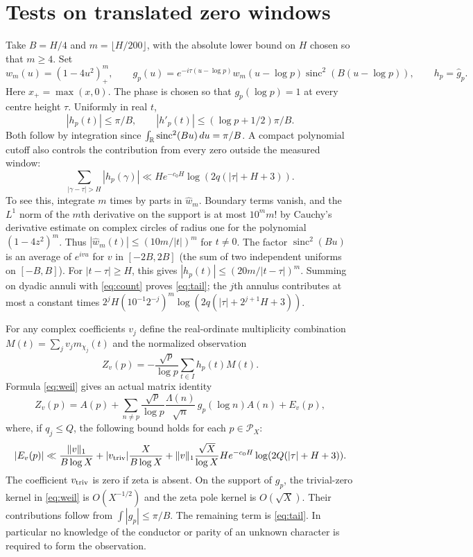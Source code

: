 \documentclass[11pt]{article}
\newcommand{\dd}{\,d}\DeclareMathOperator{\sinc}{sinc}
\newcommand{\calP}{\mathcal P}\newcommand{\wh}{\widehat}
\begin{document}
\section{Tests on translated zero windows}
Take $B=H/4$ and $m=\lfloor H/200\rfloor$, with the absolute lower
bound on $H$ chosen so that $m\ge4$. Set
\[
 w_m(u)=(1-4u^2)_+^m,\qquad
 g_p(u)= e^{-i\tau(u-\log p)}w_m(u-\log p)\sinc^2(B(u-\log p)),
 \qquad h_p=\wh g_p .
\]
Here $x_+=\max(x,0)$. The phase is chosen so that $g_p(\log p)=1$ at
every centre height $\tau$. Uniformly in real $t$,
\begin{equation}\label{eq:lip}
 |h_p(t)|\le \pi/B,\qquad |h'_p(t)|\le (\log p+1/2)\pi/B .
\end{equation}
Both follow by integration since $\int_\R\sinc^2(Bu)\dd u=\pi/B$.
A compact polynomial cutoff also controls the contribution from every
zero outside the measured window:
\begin{equation}\label{eq:tail}
 \sum_{|\gamma-\tau|>H}|h_p(\gamma)|
 \ll H e^{-c_0H}\log(2q(|\tau|+H+3)).
\end{equation}
To see this, integrate $m$ times by parts in $\wh w_m$. Boundary terms
vanish, and the $L^1$ norm of the $m$th derivative on the support is at most
$10^m m!$ by Cauchy's derivative estimate on complex circles of radius one
for the polynomial $(1-4z^2)^m$. Thus
$|\wh w_m(t)|\le(10m/|t|)^m$ for $t\ne0$.
The factor $\sinc^2(Bu)$ is an average of $e^{ivu}$ for $v$ in $[-2B,2B]$
(the sum of two independent uniforms on $[-B,B]$).
For $|t-\tau|\ge H$, this gives
$|h_p(t)|\le(20m/|t-\tau|)^m$.
Summing on dyadic annuli with \eqref{eq:count} proves \eqref{eq:tail};
the $j$th annulus contributes at most a constant times
$2^jH(10^{-1}2^{-j})^m\log(2q(|\tau|+2^{j+1}H+3))$.

For any complex coefficients $v_j$ define the real-ordinate multiplicity
combination $M(t)=\sum_jv_jm_{\chi_j}(t)$ and the normalized observation
\[
 Z_v(p)=-\frac{\sqrt p}{\log p}\sum_{t\in I}h_p(t)M(t).
\]
Formula \eqref{eq:weil} gives an actual matrix identity
\begin{equation}\label{eq:observation}
 Z_v(p)=A(p)+\sum_{n\ne p}\frac{\sqrt p}{\log p}
          \frac{\Lambda(n)}{\sqrt n}\,g_p(\log n)A(n)+E_v(p),
\end{equation}
where, if $q_j\le Q$, the following bound holds for each $p\in\calP_X$:
\begin{equation}\label{eq:errors}
 |E_v(p)|\ll
 \frac{\|v\|_1}{B\log X}
 +|v_{\rm triv}|\frac{X}{B\log X}
 +\|v\|_1\frac{\sqrt X}{\log X}
       H e^{-c_0H}\log(2Q(|\tau|+H+3)).
\end{equation}
The coefficient $v_{\rm triv}$ is zero if zeta is absent. On the support
of $g_p$, the trivial-zero kernel in \eqref{eq:weil} is $O(X^{-1/2})$ and
the zeta pole kernel is $O(\sqrt X)$. Their contributions follow from
$\int |g_p|\le\pi/B$. The remaining term is \eqref{eq:tail}.
In particular no knowledge of the conductor or parity of an unknown
character is required to form the observation.
\end{document}
